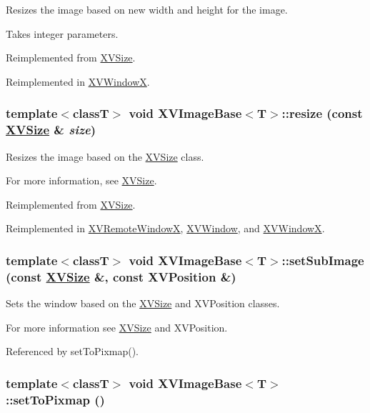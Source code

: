 Resizes the image based on new width and height for the image.

Takes integer parameters. 

Reimplemented from \hyperlink{class_XVSize_a9}{XVSize}.

Reimplemented in \hyperlink{class_XVWindowX_a3}{XVWindow\-X}.\label{XVImageBase_a13}
\hypertarget{class_XVImageBase_a13}{
\subsubsection[resize]{\setlength{\rightskip}{0pt plus 5cm}template$<$classT$>$ void XVImage\-Base$<$T$>$::resize (const \hyperlink{class_XVSize}{XVSize} \& {\em size})}}


Resizes the image based on the \hyperlink{class_XVSize}{XVSize} class.

For more information, see \hyperlink{class_XVSize}{XVSize}. 

Reimplemented from \hyperlink{class_XVSize_a8}{XVSize}.

Reimplemented in \hyperlink{class_XVRemoteWindowX_a9}{XVRemote\-Window\-X}, \hyperlink{class_XVWindow_a4}{XVWindow}, and \hyperlink{class_XVWindowX_a2}{XVWindow\-X}.\label{XVImageBase_a14}
\hypertarget{class_XVImageBase_a14}{
\subsubsection[setSubImage]{\setlength{\rightskip}{0pt plus 5cm}template$<$classT$>$ void XVImage\-Base$<$T$>$::set\-Sub\-Image (const \hyperlink{class_XVSize}{XVSize} \&, const XVPosition \&)}}


Sets the window based on the \hyperlink{class_XVSize}{XVSize} and XVPosition classes.

For more information see \hyperlink{class_XVSize}{XVSize} and XVPosition. 

Referenced by set\-To\-Pixmap().\label{XVImageBase_a17}
\hypertarget{class_XVImageBase_a17}{
\subsubsection[setToPixmap]{\setlength{\rightskip}{0pt plus 5cm}template$<$classT$>$ void XVImage\-Base$<$T$>$::set\-To\-Pixmap ()}}


